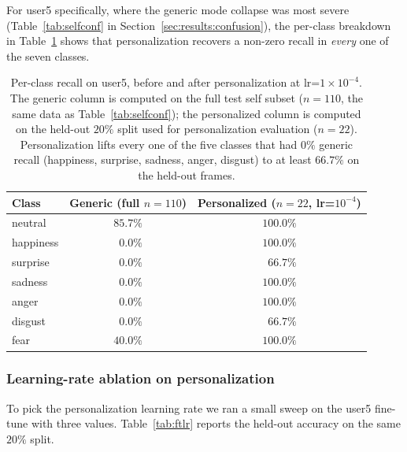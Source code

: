 \documentclass[12pt,a4paper]{article}
\begin{document}
For user5 specifically, where the generic mode collapse was
most severe (Table~\ref{tab:selfconf} in
Section~\ref{sec:results:confusion}), the per-class breakdown
in Table~\ref{tab:user5class} shows that personalization
recovers a non-zero recall in \emph{every} one of the seven
classes.

\begin{table}[H]
  \centering
  \footnotesize
  \begin{tabular}{lcc}
    \toprule
    Class & Generic (full $n=110$) & Personalized ($n=22$, lr=$10^{-4}$) \\
    \midrule
    neutral   & $85.7\%$ & $100.0\%$ \\
    happiness & $\phantom{0}0.0\%$  & $100.0\%$ \\
    surprise  & $\phantom{0}0.0\%$  & $\phantom{0}66.7\%$ \\
    sadness   & $\phantom{0}0.0\%$  & $100.0\%$ \\
    anger     & $\phantom{0}0.0\%$  & $100.0\%$ \\
    disgust   & $\phantom{0}0.0\%$  & $\phantom{0}66.7\%$ \\
    fear      & $40.0\%$ & $100.0\%$ \\
    \bottomrule
  \end{tabular}
  \caption{\footnotesize Per-class recall on user5, before and after
  personalization at lr=$1\times 10^{-4}$. The generic column
  is computed on the full test self subset ($n=110$, the same
  data as Table~\ref{tab:selfconf}); the personalized column
  is computed on the held-out $20\%$ split used for
  personalization evaluation ($n=22$). Personalization lifts
  every one of the five classes that had $0\%$ generic recall
  (happiness, surprise, sadness, anger, disgust) to at least
  $66.7\%$ on the held-out frames.}
  \label{tab:user5class}
\end{table}

\subsubsection*{Learning-rate ablation on personalization}

To pick the personalization learning rate we ran a small
sweep on the user5 fine-tune with three values.
Table~\ref{tab:ftlr} reports the held-out accuracy on the
same $20\%$ split.
\end{document}

